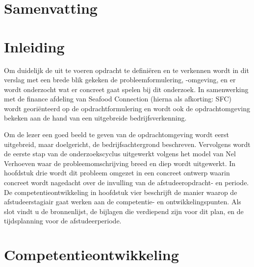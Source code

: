 \documentclass[10pt,a4paper,oneside]{report}
\newcounter{bijlage}[section] %
\begin{document}
\chapter*{Samenvatting}
\thispagestyle{empty}
\lipsum[1-4]

\setcounter{page}{4} %
\tableofcontents
\thispagestyle{empty}

\chapter*{Inleiding}
Om duidelijk de uit te voeren opdracht te definiëren en te verkennen wordt in dit verslag met een brede blik gekeken de probleemformulering, -omgeving, en er wordt onderzocht wat er concreet gaat spelen bij dit onderzoek. In samenwerking met de finance afdeling van Seafood Connection (hierna als afkorting: SFC) wordt georiënteerd op de opdrachtformulering en wordt ook de opdrachtomgeving bekeken aan de hand van een uitgebreide bedrijfsverkenning. 

Om de lezer een goed beeld te geven van de opdrachtomgeving wordt eerst uitgebreid, maar doelgericht, de bedrijfsachtergrond beschreven. Vervolgens wordt de eerste stap van de onderzoekscyclus uitgewerkt volgens het model van Nel Verhoeven waar de probleemomschrijving breed en diep wordt uitgewerkt. In hoofdstuk drie wordt dit probleem omgezet in een concreet ontwerp waarin concreet wordt nagedacht over de invulling van de afstudeeropdracht- en periode. De competentieontwikkeling in hoofdstuk vier beschrijft de manier waarop de afstudeerstagiair gaat werken aan de competentie- en ontwikkelingspunten. Als slot vindt u de bronnenlijst, de bijlagen die verdiepend zijn voor dit plan, en de tijdsplanning voor de afstudeerperiode. 



\chapter{Competentieontwikkeling}
\end{document}
